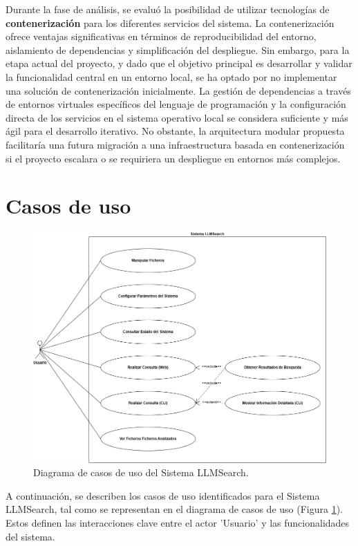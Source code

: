 Durante la fase de análisis, se evaluó la posibilidad de utilizar tecnologías de \textbf{contenerización} para los diferentes servicios del sistema. La contenerización ofrece ventajas significativas en términos de reproducibilidad del entorno, aislamiento de dependencias y simplificación del despliegue. Sin embargo, para la etapa actual del proyecto, y dado que el objetivo principal es desarrollar y validar la funcionalidad central en un entorno local, se ha optado por no implementar una solución de contenerización inicialmente. La gestión de dependencias a través de entornos virtuales específicos del lenguaje de programación y la configuración directa de los servicios en el sistema operativo local se considera suficiente y más ágil para el desarrollo iterativo. No obstante, la arquitectura modular propuesta facilitaría una futura migración a una infraestructura basada en contenerización si el proyecto escalara o se requiriera un despliegue en entornos más complejos.

\section{Casos de uso}
\label{sec:casos_de_uso}

\begin{figure}[H]
\centering
\includegraphics[width=\textwidth]{archivos/casos_de_uso.png}
\caption[Diagrama de Casos de Uso de LLMSearch]{Diagrama de casos de uso del Sistema LLMSearch.}
\label{fig:casos_de_uso}
\end{figure}

A continuación, se describen los casos de uso identificados para el Sistema LLMSearch, tal como se representan en el diagrama de casos de uso (Figura \ref{fig:casos_de_uso}). Estos definen las interacciones clave entre el actor 'Usuario' y las funcionalidades del sistema.

